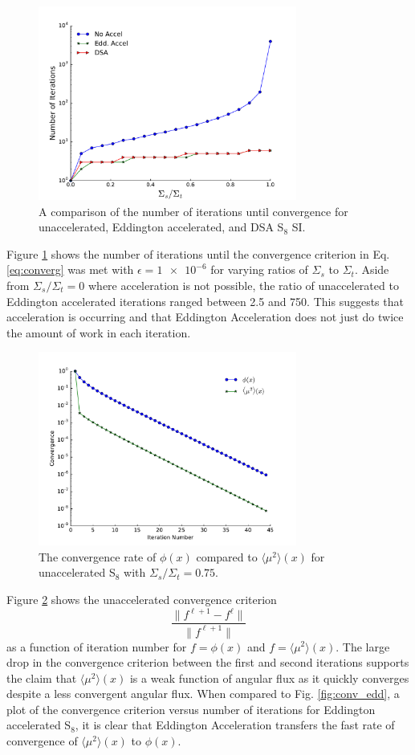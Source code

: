 \documentclass{anstrans}
\newcommand{\edd}{\langle \mu^2 \rangle}
\begin{document}
	\begin{figure} 
		\centering
		\includegraphics[width=8.5cm]{accel.pdf}
		\caption{A comparison of the number of iterations until convergence for unaccelerated, Eddington accelerated, and DSA S$_8$ SI. }
		\label{fig:comparison}
	\end{figure}

	Figure \ref{fig:comparison} shows the number of iterations until the convergence criterion in  Eq. \ref{eq:converg} was met with $\epsilon = \num{1e-6}$ for varying ratios of $\Sigma_s$ to $\Sigma_t$. Aside from $\Sigma_s/\Sigma_t = 0$ where acceleration is not possible, the ratio of unaccelerated to Eddington accelerated iterations ranged between 2.5 and 750. This suggests that acceleration is occurring and that Eddington Acceleration does not just do twice the amount of work in each iteration. 

	\begin{figure}
		\centering
		\includegraphics[width=8.5cm]{eddCon_si.pdf}
		\caption{The convergence rate of $\phi(x)$ compared to $\edd(x)$ for unaccelerated S$_8$ with $\Sigma_s/\Sigma_t = 0.75$. }
		\label{fig:conv_si}
	\end{figure}

	Figure \ref{fig:conv_si} shows the unaccelerated convergence criterion 
		\begin{equation}
			\frac{\|f^{\ell+1} - f^{\ell}\|}{\|f^{\ell+1}\|}
		\end{equation}
	as a function of iteration number for $f = \phi(x)$ and $f = \edd(x)$. The large drop in the convergence criterion between the first and second iterations supports the claim that $\edd(x)$ is a weak function of angular flux as it quickly converges despite a less convergent angular flux. When compared to Fig. \ref{fig:conv_edd}, a plot of the convergence criterion versus number of iterations for Eddington accelerated S$_8$, it is clear that Eddington Acceleration transfers the fast rate of convergence of $\edd(x)$ to $\phi(x)$. 
\end{document}
